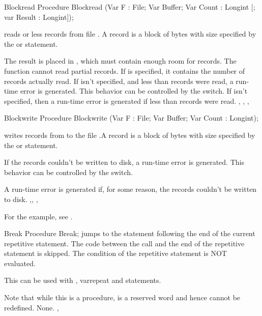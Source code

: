 \documentclass{report}
\begin{document}

\begin{procedure}{Blockread}
\Declaration
Procedure Blockread (Var F : File; Var Buffer; Var Count : Longint [; var
Result : Longint]);

\Description
{} reads  or less records from file . A
record is a block of bytes with size specified by the  or
 statement.

The result is placed in , which must contain enough room for
 records. The function cannot read partial records.
If  is specified, it contains the number of records actually
read. If  isn't specified, and less than  records were
read, a run-time error is generated. This behavior can be controlled by the
 switch.
\Errors
If  isn't specified, then a run-time error is generated if less
than  records were read.
\SeeAlso
{}, , , 
\end{procedure}


\begin{procedure}{Blockwrite}
\Declaration
Procedure Blockwrite (Var F : File; Var Buffer; Var Count : Longint);

\Description
{} writes  records from  to the file
 .A record is a block of bytes with size specified by the  or
 statement.

If the records couldn't be written to disk, a run-time error is generated.
This behavior can be controlled by the  switch.

\Errors
A run-time error is generated if, for some reason, the records couldn't be
written to disk.
\SeeAlso
{},, , 
\end{procedure}

For the example, see .

\begin{procedure}{Break}
\Declaration
Procedure Break;
\Description
{} jumps to the statement following the end of the current 
repetitive statement. The code between the  call and 
the end of the repetitive statement is skipped. 
The condition of the repetitive statement is NOT evaluated.

This can be used with , var{repeat} and  statements.

Note that while this is a procedure,  is a reserved word
and hence cannot be redefined.
\Errors
None.
\SeeAlso
{}, 
\end{procedure}
\end{document}
